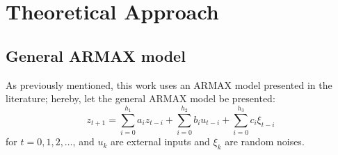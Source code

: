 \section{Theoretical Approach}\label{sec:theo}
\subsection{General ARMAX model}

As previously mentioned, this work uses an ARMAX model presented in the literature; hereby, let the general ARMAX model be presented:
\begin{equation}
    z_{t+1}=\sum_{i=0}^{h_1}a_iz_{t-i}+\sum_{i=0}^{h_2}b_iu_{t-i}+\sum_{i=0}^{h_3}c_i\xi_{t-i}
\end{equation}
for $t=0,1,2,\ldots$, and $u_k$ are external inputs and $\xi_k$ are random noises. 

